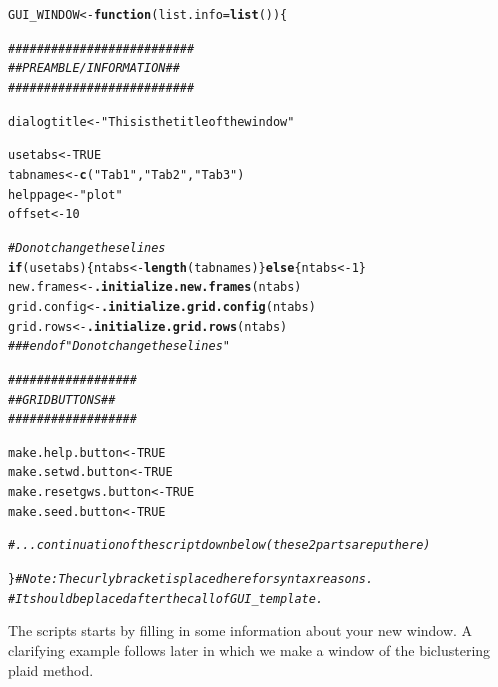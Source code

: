\documentclass[a4paper]{article}\usepackage[]{graphicx}\usepackage[]{color}
\makeatletter
\newcommand{\hlnum}[1]{\textcolor[rgb]{0.686,0.059,0.569}{#1}}%
\newcommand{\hlstr}[1]{\textcolor[rgb]{0.192,0.494,0.8}{#1}}%
\newcommand{\hlcom}[1]{\textcolor[rgb]{0.678,0.584,0.686}{\textit{#1}}}%
\newcommand{\hlstd}[1]{\textcolor[rgb]{0.345,0.345,0.345}{#1}}%
\newcommand{\hlkwa}[1]{\textcolor[rgb]{0.161,0.373,0.58}{\textbf{#1}}}%
\newcommand{\hlkwb}[1]{\textcolor[rgb]{0.69,0.353,0.396}{#1}}%
\newcommand{\hlkwc}[1]{\textcolor[rgb]{0.333,0.667,0.333}{#1}}%
\newcommand{\hlkwd}[1]{\textcolor[rgb]{0.737,0.353,0.396}{\textbf{#1}}}%
\newenvironment{kframe}{%
 \def\at@end@of@kframe{}%
 \ifinner\ifhmode%
  \def\at@end@of@kframe{\end{minipage}}%
  \begin{minipage}{\columnwidth}%
 \fi\fi%
 \def\FrameCommand##1{\hskip\@totalleftmargin \hskip-\fboxsep
 \colorbox{shadecolor}{##1}\hskip-\fboxsep
     \hskip-\linewidth \hskip-\@totalleftmargin \hskip\columnwidth}%
 \MakeFramed {\advance\hsize-\width
   \@totalleftmargin\z@ \linewidth\hsize
   \@setminipage}}%
 {\par\unskip\endMakeFramed%
 \at@end@of@kframe}
\newenvironment{knitrout}{}{} %
\makeatother
\begin{document}
\begin{knitrout}
\color{fgcolor}\begin{kframe}
\begin{alltt}
\hlstd{GUI_WINDOW} \hlkwb{<-} \hlkwa{function}\hlstd{(}\hlkwc{list.info}\hlstd{=}\hlkwd{list}\hlstd{())\{}

        \hlcom{##########################}
        \hlcom{## PREAMBLE/INFORMATION ##}
        \hlcom{##########################}

        \hlstd{dialogtitle} \hlkwb{<-} \hlstr{"This is the title of the window"}

        \hlstd{usetabs} \hlkwb{<-} \hlnum{TRUE}
        \hlstd{tabnames} \hlkwb{<-} \hlkwd{c}\hlstd{(}\hlstr{"Tab 1"}\hlstd{,}\hlstr{"Tab 2"}\hlstd{,}\hlstr{"Tab 3"}\hlstd{)}
        \hlstd{helppage} \hlkwb{<-} \hlstr{"plot"}
        \hlstd{offset} \hlkwb{<-} \hlnum{10}

        \hlcom{# Do not change these lines}
        \hlkwa{if}\hlstd{(usetabs)\{ntabs} \hlkwb{<-} \hlkwd{length}\hlstd{(tabnames)\}} \hlkwa{else} \hlstd{\{ntabs} \hlkwb{<-} \hlnum{1}\hlstd{\}}
        \hlstd{new.frames} \hlkwb{<-} \hlkwd{.initialize.new.frames}\hlstd{(ntabs)}
        \hlstd{grid.config} \hlkwb{<-} \hlkwd{.initialize.grid.config}\hlstd{(ntabs)}
        \hlstd{grid.rows} \hlkwb{<-} \hlkwd{.initialize.grid.rows}\hlstd{(ntabs)}
        \hlcom{### end of "Do not change these lines"}

        \hlcom{##################}
        \hlcom{## GRID BUTTONS ##}
        \hlcom{##################}

        \hlstd{make.help.button} \hlkwb{<-} \hlnum{TRUE}
        \hlstd{make.setwd.button} \hlkwb{<-} \hlnum{TRUE}
        \hlstd{make.resetgws.button} \hlkwb{<-} \hlnum{TRUE}
        \hlstd{make.seed.button} \hlkwb{<-} \hlnum{TRUE}

        \hlcom{# ... continuation of the script down below (these 2 parts are put here)	}

\hlstd{\}}       \hlcom{# Note: The curly bracket is placed here for syntax reasons. }
        \hlcom{#       It should be placed after the call of GUI_template.}
\end{alltt}
\end{kframe}
\end{knitrout}
\noindent The scripts starts by filling in some information about your
new window. A clarifying example follows later in which we make a window of the
biclustering plaid method.
\end{document}
